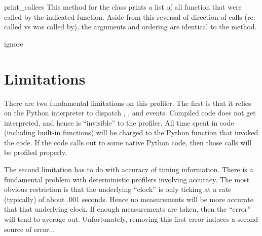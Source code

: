 \begin{methoddesc}[Stats]{print_callees}{}
This method for the  class prints a list of all function
that were called by the indicated function.  Aside from this reversal
of direction of calls (re: called vs was called by), the arguments and
ordering are identical to the  method.
\end{methoddesc}

\begin{methoddesc}[Stats]{ignore}{}
\end{methoddesc}


\section{Limitations \label{profile-limits}}

There are two fundamental limitations on this profiler.  The first is
that it relies on the Python interpreter to dispatch ,
, and  events.  Compiled \C{} code does not
get interpreted, and hence is ``invisible'' to the profiler.  All time
spent in \C{} code (including built-in functions) will be charged to the
Python function that invoked the \C{} code.  If the \C{} code calls out
to some native Python code, then those calls will be profiled
properly.

The second limitation has to do with accuracy of timing information.
There is a fundamental problem with deterministic profilers involving
accuracy.  The most obvious restriction is that the underlying ``clock''
is only ticking at a rate (typically) of about .001 seconds.  Hence no
measurements will be more accurate that that underlying clock.  If
enough measurements are taken, then the ``error'' will tend to average
out. Unfortunately, removing this first error induces a second source
of error...

